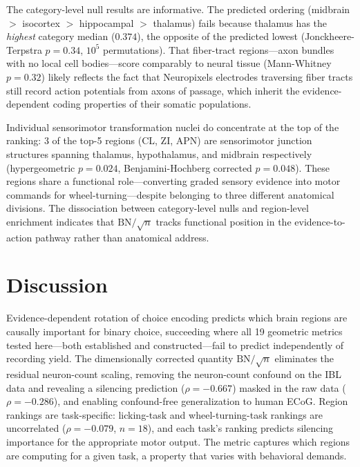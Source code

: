 \documentclass[9pt,lineno]{elife}
\begin{document}
The category-level null results are informative. The predicted ordering (midbrain $>$ isocortex $>$ hippocampal $>$ thalamus) fails because thalamus has the \emph{highest} category median ($0.374$), the opposite of the predicted lowest (Jonckheere-Terpstra $p = 0.34$, $10^5$ permutations). That fiber-tract regions---axon bundles with no local cell bodies---score comparably to neural tissue (Mann-Whitney $p = 0.32$) likely reflects the fact that Neuropixels electrodes traversing fiber tracts still record action potentials from axons of passage, which inherit the evidence-dependent coding properties of their somatic populations.

Individual sensorimotor transformation nuclei do concentrate at the top of the ranking: 3 of the top-5 regions (CL, ZI, APN) are sensorimotor junction structures spanning thalamus, hypothalamus, and midbrain respectively (hypergeometric $p = 0.024$, Benjamini-Hochberg corrected $p = 0.048$). These regions share a functional role---converting graded sensory evidence into motor commands for wheel-turning---despite belonging to three different anatomical divisions. The dissociation between category-level nulls and region-level enrichment indicates that $\text{BN}/\!\sqrt{n}$ tracks functional position in the evidence-to-action pathway rather than anatomical address.


\section{Discussion}

Evidence-dependent rotation of choice encoding predicts which brain regions are causally important for binary choice, succeeding where all 19 geometric metrics tested here---both established and constructed---fail to predict independently of recording yield. The dimensionally corrected quantity $\text{BN}/\!\sqrt{n}$ eliminates the residual neuron-count scaling, removing the neuron-count confound on the IBL data and revealing a silencing prediction ($\rho = -0.667$) masked in the raw data ($\rho = -0.286$), and enabling confound-free generalization to human ECoG. Region rankings are task-specific: licking-task and wheel-turning-task rankings are uncorrelated ($\rho = -0.079$, $n = 18$), and each task's ranking predicts silencing importance for the appropriate motor output. The metric captures which regions are computing for a given task, a property that varies with behavioral demands.
\end{document}
